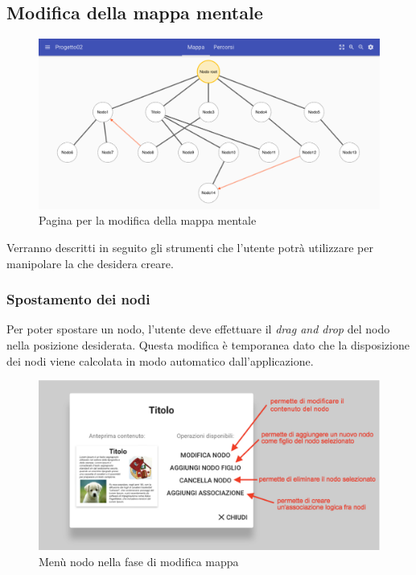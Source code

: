 \subsection{Modifica della mappa mentale}
\begin{figure}[H]
\centering
\includegraphics[scale=0.3]{immagini/modificaMappa.pdf}
\caption{Pagina per la modifica della mappa mentale}
\end{figure}
\FloatBarrier
Verranno descritti in seguito gli strumenti che l'utente potrà utilizzare per manipolare la  che desidera creare.

\subsubsection{Spostamento dei nodi}
Per poter spostare un nodo, l'utente deve effettuare il \textit{drag and drop} del nodo nella posizione desiderata. Questa modifica è temporanea dato che la disposizione dei nodi viene calcolata in modo automatico dall'applicazione.

\begin{figure}[H]
\centering
\includegraphics[scale=0.5]{immagini/menuNodoMappa.pdf}
\caption{Menù nodo nella fase di modifica mappa \label{menuNodoMappa}}
\end{figure}
